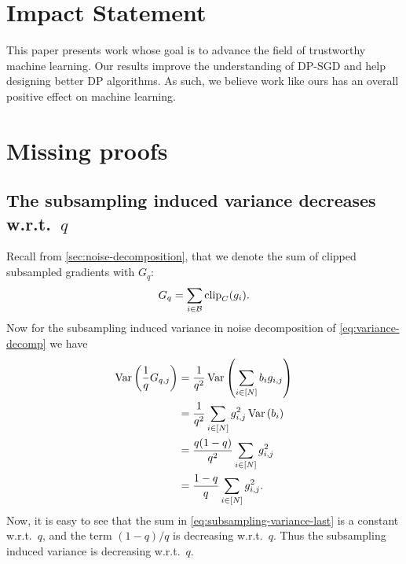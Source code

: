 \documentclass{article}
\theoremstyle{plain}
\theoremstyle{definition}
\theoremstyle{remark}
\begin{document}
\section*{Impact Statement}
This paper presents work whose goal is to advance the field of 
trustworthy machine learning.
Our results improve the understanding of DP-SGD and help designing 
better DP algorithms. As such, we believe work like ours has an 
overall positive effect on machine learning.





\newpage
\appendix
\onecolumn

\section{Missing proofs}\label{app:missing-proofs}

\subsection{The subsampling induced variance decreases w.r.t.\ $q$}
\label{app:subsampling-variance}
Recall from \cref{sec:noise-decomposition}, that we denote the sum of clipped
subsampled gradients with $G_q$:
\begin{align}
    G_q = 
        \sum_{i\in \mathcal{B}}\mathrm{clip}_C(g_i).
\end{align}
Now for the subsampling induced variance in noise decomposition of \cref{eq:variance-decomp}
we have
\begin{align}
    \operatorname{Var}\left( \frac{1}{q} G_{q, j} \right) 
        &= \frac{1}{q^2} \operatorname{Var}\left( \sum_{i \in [N]} b_i g_{i,j} \right) \\
        &= \frac{1}{q^2}  \sum_{i \in [N]} g_{i,j}^2 \operatorname{Var}\left( b_i  \right) \\
        &= \frac{q(1-q)}{q^2}  \sum_{i \in [N]} g_{i,j}^2 \\
        &= \frac{1-q}{q}  \sum_{i \in [N]} g_{i,j}^2 \label{eq:subsampling-variance-last}.
\end{align}
Now, it is easy to see that the sum in \cref{eq:subsampling-variance-last} is a 
constant w.r.t.\ $q$, and the term $(1-q)/q$ is decreasing w.r.t.\ $q$. Thus
the subsampling induced variance is decreasing w.r.t.\ $q$.
\end{document}
